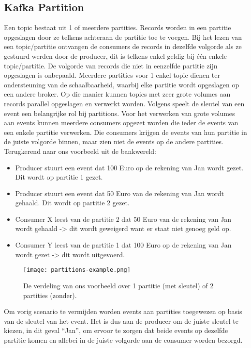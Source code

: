 \subsection{Kafka Partition}
Een topic bestaat uit 1 of meerdere partities. Records worden in een partitie opgeslagen door ze telkens achteraan de partitie toe te voegen. Bij het lezen van een topic/partitie ontvangen de consumers de records in dezelfde volgorde als ze gestuurd werden door de producer, dit is telkens enkel geldig bij één enkele topic/partitie. De volgorde van records die niet in eenzelfde partitie zijn opgeslagen is onbepaald.
Meerdere partities voor 1 enkel topic dienen ter ondersteuning van de schaalbaarheid, waarbij elke partitie wordt opgeslagen op een andere broker. Op die manier kunnen topics met zeer grote volumes aan records parallel opgeslagen en verwerkt worden.
\newline
\newline
Volgens \textcite{Harbour2023} speelt de sleutel van een event een belangrijke rol bij partitions. Voor het verwerken van grote volumes aan events kunnen meerdere consumers opgezet worden die ieder de events van een enkele partitie verwerken. Die consumers krijgen de events van hun partitie in de juiste volgorde binnen, maar zien niet de events op de andere partities. Terugkerend naar ons voorbeeld uit de bankwereld:
\begin{itemize}
    \item Producer stuurt een event dat 100 Euro op de rekening van Jan wordt gezet. Dit wordt op partitie 1 gezet.
    \item Producer stuurt een event dat 50 Euro van de rekening van Jan wordt gehaald. Dit wordt op partitie 2 gezet.
    \item Consumer X leest van de partitie 2 dat 50 Euro van de rekening van Jan wordt gehaald -> dit wordt geweigerd want er staat niet genoeg geld op.
    \item Consumer Y leest van de partitie 1 dat 100 Euro op de rekening van Jan wordt gezet -> dit wordt uitgevoerd.
\end{itemize}

\begin{figure}[H]
    \texttt{[image: partitions-example.png]}
    \caption{De verdeling van ons voorbeeld over 1 partitie (met sleutel) of 2 partities (zonder).}
\end{figure}

Om vorig scenario te vermijden worden events aan partities toegewezen op basis van de sleutel van het event. Het is dus aan de producer om de juiste sleutel te kiezen, in dit geval ``Jan'', om ervoor te zorgen dat beide events op dezelfde partitie komen en allebei in de juiste volgorde aan de consumer worden bezorgd.
\newline
\newline


